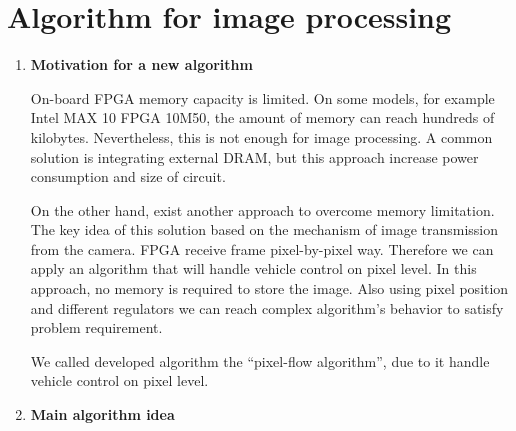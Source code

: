 \documentclass[a4paper,12pt]{article} %
\begin{document}
	
\section*{Algorithm for image processing}
\begin{enumerate}
	\item \textbf{Motivation for a new algorithm}
	
	On-board FPGA memory capacity is limited. On some models, for example Intel MAX 10 FPGA 10M50, the amount of memory can reach hundreds of kilobytes. Nevertheless, this is not enough for image processing. A common solution is integrating external DRAM, but this approach increase power consumption and  size of circuit. 
	
	On the other hand, exist another approach to overcome memory limitation. The key idea of this solution based on the mechanism of image transmission from the camera. FPGA receive frame pixel-by-pixel way. Therefore we can apply an algorithm that will handle vehicle control on pixel level. In this approach, no memory is required to store the image. Also using pixel position and different regulators we can reach complex algorithm's behavior to satisfy problem requirement.
	
	We called developed algorithm the \textquotedblleft pixel-flow algorithm\textquotedblright, due to it handle vehicle control on pixel level. 

	
	
	
	
	\item \textbf{Main algorithm idea}
	

\end{enumerate}
\end{document}
